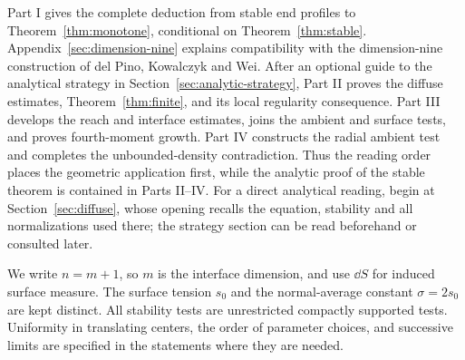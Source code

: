 Part I gives the complete deduction from stable end profiles to
Theorem~\ref{thm:monotone}, conditional on
Theorem~\ref{thm:stable}.
Appendix~\ref{sec:dimension-nine} explains compatibility with the
dimension-nine construction of del Pino, Kowalczyk and Wei.
After an optional guide to the analytical strategy in
Section~\ref{sec:analytic-strategy}, Part II proves the diffuse estimates,
Theorem~\ref{thm:finite}, and its local regularity consequence.
Part III develops the reach and interface estimates, joins the
ambient and surface tests, and proves fourth-moment growth.
Part IV constructs the radial ambient test and completes the
unbounded-density contradiction.
Thus the reading order places the geometric application first,
while the analytic proof of the stable theorem is contained in
Parts II--IV.  For a direct analytical reading, begin at
Section~\ref{sec:diffuse}, whose opening recalls the equation, stability
and all normalizations used there; the strategy section can be read
beforehand or consulted later.

We write $n=m+1$, so $m$ is the interface dimension, and use
$\dd S$ for induced surface measure.
The surface tension $s_0$ and the normal-average constant
$\sigma=2s_0$ are kept distinct.
All stability tests are unrestricted compactly supported tests.
Uniformity in translating centers, the order of parameter choices,
and successive limits are specified in the statements where
they are needed.
